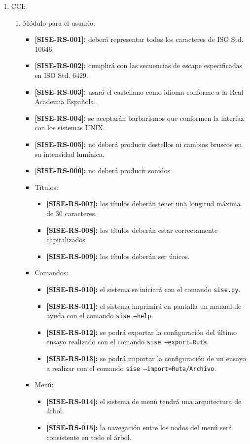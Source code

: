 \documentclass[
11pt, %
codirector, %
]{charter}
\def\codigo{SISE-RS}
\newcommand{\req}[1]{\textbf{[\codigo-#1]:}}
\begin{document}
\begin{enumerate}
	\item CCI:
		\begin{enumerate}
			\item Módulo para el usuario:
				\begin{itemize}
					\item \req{001} deberá representar todos los caracteres de ISO Std. 10646.
					\item \req{002} cumplirá con las secuencias de escape especificadas en ISO Std. 6429.
					\item \req{003} usará el castellano como idioma conforme a la Real Academia Española.
					\item \req{004} se aceptarán barbarismos que conformen la interfaz con los sistemas UNIX.
					\item \req{005} no deberá producir destellos ni cambios bruscos en su intensidad lumínica.
					\item \req{006} no deberá producir sonidos
					\item Títulos:
						\begin{itemize}
							\item \req{007} los títulos deberán tener una longitud máxima de 30 caracteres.
							\item \req{008} los títulos deberán estar correctamente capitalizados.
							\item \req{009} los títulos deberán ser únicos.
						\end{itemize}
					\item Comandos:
						\begin{itemize}
							\item \req{010} el sistema se iniciará con el comando \texttt{sise.py}.
							\item \req{011} el sistema imprimirá en pantalla un manual de ayuda con el comando \texttt{sise --help}.
							\item \req{012} se podrá exportar la configuración del último ensayo realizado con el comando \texttt{sise --export=Ruta}.
							\item \req{013} se podrá importar la configuración de un ensayo a realizar con el comando \texttt{sise --import=Ruta/Archivo}.
						\end{itemize}
					\item Menú:
						\begin{itemize}
							\item \req{014} el sistema de menú tendrá una arquitectura de árbol.
							\item \req{015} la navegación entre los nodos del menú será consistente en todo el árbol.

\end{itemize}
\end{itemize}
\end{enumerate}
\end{enumerate}
\end{document}
